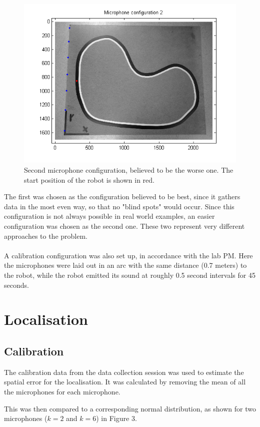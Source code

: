 \documentclass[11pt]{article}
\begin{document}
\begin{figure}[h!]
\centering
\includegraphics[width=\textwidth]{microphone_configuration_2.png}
\caption{Second microphone configuration, believed to be the worse one. The start position of the robot is shown in red.}
\end{figure}
\newpage
The first was chosen as the configuration believed to be best, since it gathers data in the most even way, so that no "blind spots" would occur. Since this configuration is not always possible in real world examples, an easier configuration was chosen as the second one. These two represent very different approaches to the problem.\\\\
A calibration configuration was also set up, in accordance with the lab PM. Here the microphones were laid out in an arc with the same distance (0.7 meters) to the robot, while the robot emitted its sound at roughly 0.5 second intervals for 45 seconds.
\section{Localisation}
\subsection{Calibration}
The calibration data from the data collection session was used to estimate the spatial error for the localisation. It was calculated by removing the mean of all the microphones for each microphone.


This was then compared to a corresponding normal distribution, as shown for two microphones ($k=2$ and $k=6$) in Figure 3. 
\end{document}
